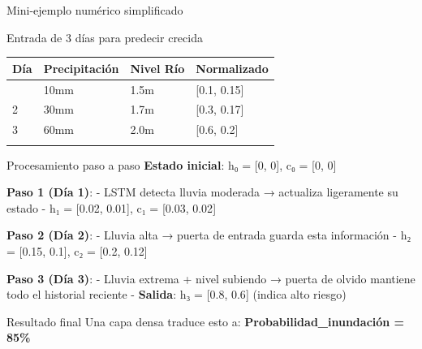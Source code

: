 \documentclass[
  ignorenonframetext,
]{beamer}
\begin{document}
\begin{frame}{Mini-ejemplo numérico simplificado}
\label{mini-ejemplo-numuxe9rico-simplificado}
\begin{block}{Entrada de 3 días para predecir crecida}
\label{entrada-de-3-duxedas-para-predecir-crecida}
\begin{longtable}[]{@{}llll@{}}
\toprule\noalign{}
Día & Precipitación & Nivel Río & Normalizado \\
\midrule\noalign{}
\endhead
1 & 10mm & 1.5m & {[}0.1, 0.15{]} \\
2 & 30mm & 1.7m & {[}0.3, 0.17{]} \\
3 & 60mm & 2.0m & {[}0.6, 0.2{]} \\
\bottomrule\noalign{}
\end{longtable}
\end{block}

\begin{block}{Procesamiento paso a paso}
\label{procesamiento-paso-a-paso}
\textbf{Estado inicial}: h₀ = {[}0, 0{]}, c₀ = {[}0, 0{]}

\textbf{Paso 1 (Día 1)}: - LSTM detecta lluvia moderada → actualiza
ligeramente su estado - h₁ = {[}0.02, 0.01{]}, c₁ = {[}0.03, 0.02{]}

\textbf{Paso 2 (Día 2)}: - Lluvia alta → puerta de entrada guarda esta
información - h₂ = {[}0.15, 0.1{]}, c₂ = {[}0.2, 0.12{]}

\textbf{Paso 3 (Día 3)}: - Lluvia extrema + nivel subiendo → puerta de
olvido mantiene todo el historial reciente - \textbf{Salida}: h₃ =
{[}0.8, 0.6{]} (indica alto riesgo)
\end{block}

\begin{block}{Resultado final}
\label{resultado-final}
Una capa densa traduce esto a: \textbf{Probabilidad\_inundación = 85\%}
\end{block}
\end{frame}
\end{document}
